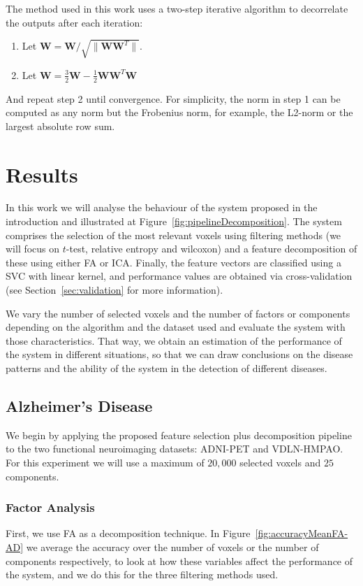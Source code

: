 The method used in this work uses a two-step iterative algorithm \cite{Hyvarinen2000} to decorrelate the outputs after each iteration: 
\begin{enumerate}
\item Let $\mathbf{W} = \mathbf{W}/\sqrt{\lVert\mathbf{W}\mathbf{W}^T\rVert}$. 
\item Let $\mathbf{W} = \frac{3}{2} \mathbf{W}-\frac{1}{2} \mathbf{W} \mathbf{W}^T  \mathbf{W}$
\end{enumerate}

And repeat step 2 until convergence. For simplicity, the norm in step 1 can be computed as any norm but the Frobenius norm, for example, the L2-norm or the largest absolute row sum. 

\section{Results}
In this work we will analyse the behaviour of the system proposed in the introduction and illustrated at Figure~\ref{fig:pipelineDecomposition}. The system comprises the selection of the most relevant voxels using filtering methods (we will focus on $t$-test, relative entropy and wilcoxon) and a feature decomposition of these using either \ac{FA} or \ac{ICA}. Finally, the feature vectors are classified using a \ac{SVC} with linear kernel, and performance values are obtained via cross-validation (see Section~\ref{sec:validation} for more information). 

We vary the number of selected voxels and the number of factors or components depending on the algorithm and the dataset used and evaluate the system with those characteristics. That way, we obtain an estimation of the performance of the system in different situations, so that we can draw conclusions on the disease patterns and the ability of the system in the detection of different diseases. 

\subsection{Alzheimer's Disease}
We begin by applying the proposed feature selection plus decomposition pipeline to the two functional neuroimaging datasets: ADNI-PET and VDLN-HMPAO. For this experiment we will use a maximum of $20,000$ selected voxels and $25$ components. 

\subsubsection{Factor Analysis}\label{sec:results_FA_AD}
First, we use \ac{FA} as a decomposition technique. In Figure~\ref{fig:accuracyMeanFA-AD} we average the accuracy over the number of voxels or the number of components respectively, to look at how these variables affect the performance of the system, and we do this for the three filtering methods used. 

